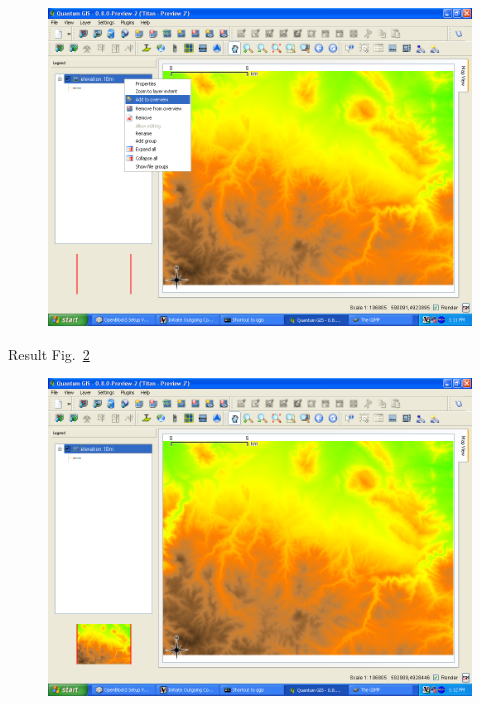 \begin{figure}[htbp]
   \centering
   \includegraphics[scale=0.2]{qgis017.png}
   \caption{}
   \label{fig:qgis0017}
\end{figure}

Result Fig.~\ref{fig:qgis018}

\begin{figure}[htbp]
   \centering
   \includegraphics[scale=0.2]{qgis018.png}
   \caption{}
   \label{fig:qgis018}
\end{figure}

